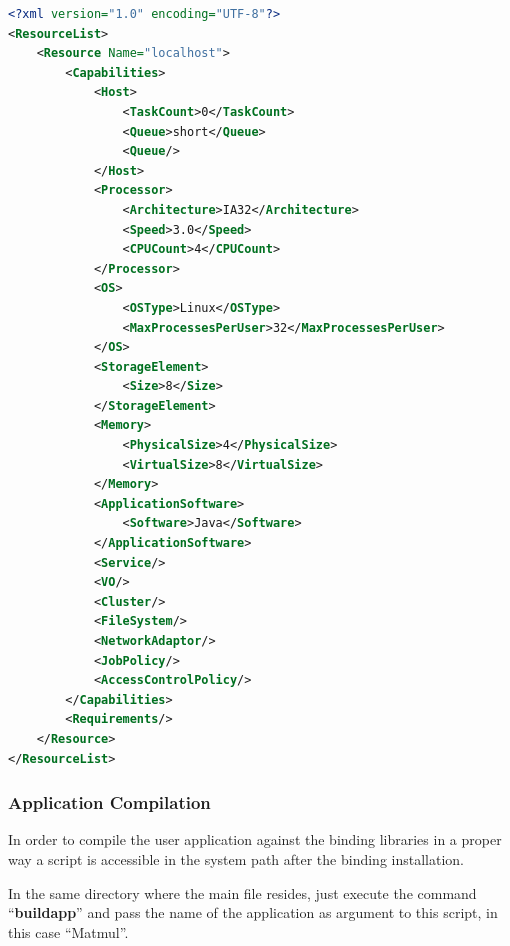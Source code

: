 \begin{lstlisting}[language=xml] 
<?xml version="1.0" encoding="UTF-8"?>
<ResourceList>
    <Resource Name="localhost">
        <Capabilities>
            <Host>
                <TaskCount>0</TaskCount>
                <Queue>short</Queue>
                <Queue/>
            </Host>
            <Processor>
                <Architecture>IA32</Architecture>
                <Speed>3.0</Speed>
                <CPUCount>4</CPUCount>
            </Processor>
            <OS>
                <OSType>Linux</OSType>
                <MaxProcessesPerUser>32</MaxProcessesPerUser>
            </OS>
            <StorageElement>
                <Size>8</Size>
            </StorageElement>
            <Memory>
                <PhysicalSize>4</PhysicalSize>
                <VirtualSize>8</VirtualSize>
            </Memory>
            <ApplicationSoftware>
                <Software>Java</Software>
            </ApplicationSoftware>
            <Service/>
            <VO/>
            <Cluster/>
            <FileSystem/>
            <NetworkAdaptor/>
            <JobPolicy/>
            <AccessControlPolicy/>
        </Capabilities>
        <Requirements/>
    </Resource>
</ResourceList>
\end{lstlisting}

\subsubsection{Application Compilation}
In order to compile the user application against the binding libraries in a proper way a script is 
accessible in the system path after the binding installation.

In the same directory where the main file resides, just execute the command ``{\bf buildapp}'' and 
pass the name of the application as argument to this script, in this case ``Matmul''.

